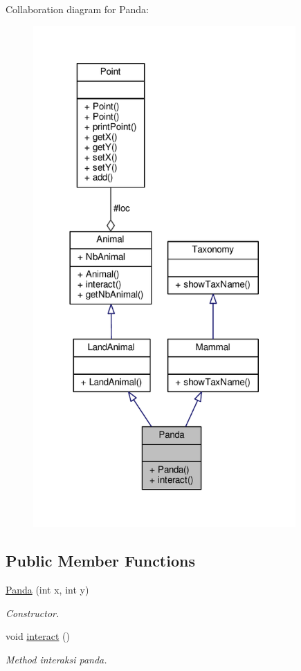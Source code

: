 Collaboration diagram for Panda\+:
\nopagebreak
\begin{figure}[H]
\begin{center}
\leavevmode
\includegraphics[width=284pt]{classPanda__coll__graph}
\end{center}
\end{figure}
\subsection*{Public Member Functions}
\begin{DoxyCompactItemize}
\item 
\hyperlink{classPanda_a9d007730c0a0dae0836e7be527610c42}{Panda} (int x, int y)
\begin{DoxyCompactList}\small\item\em Constructor. \end{DoxyCompactList}\item 
void \hyperlink{classPanda_a04e6a6078ef1240c1407fe1fd6c28237}{interact} ()\hypertarget{classPanda_a04e6a6078ef1240c1407fe1fd6c28237}{}\label{classPanda_a04e6a6078ef1240c1407fe1fd6c28237}

\begin{DoxyCompactList}\small\item\em Method interaksi panda. \end{DoxyCompactList}\end{DoxyCompactItemize}
